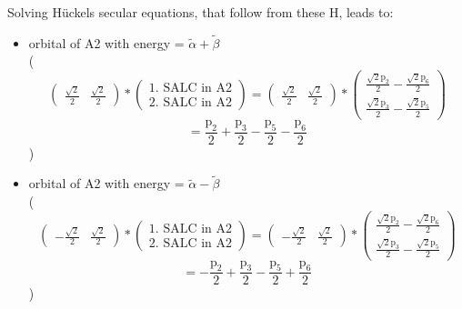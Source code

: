 \documentclass[12pt,a4paper]{article}
\begin{document}
Solving Hückels secular equations, that follow from these H, leads to:
\begin{itemize}
\item orbital of A2 with energy = 
                                $\tilde{\alpha} + \tilde{\beta}$ \\
( 
$$
\begin{pmatrix}\frac{\sqrt{2}}{2} & \frac{\sqrt{2}}{2}\end{pmatrix} * \left(\begin{array}{c}\text{1. SALC in A2} \\ \text{2. SALC in A2}\end{array}\right) = \begin{pmatrix}\frac{\sqrt{2}}{2} & \frac{\sqrt{2}}{2}\end{pmatrix} * \begin{pmatrix}\frac{\sqrt{2} \text{p}_{2}}{2} - \frac{\sqrt{2} \text{p}_{6}}{2}\\\frac{\sqrt{2} \text{p}_{3}}{2} - \frac{\sqrt{2} \text{p}_{5}}{2}\end{pmatrix} 
 $$ $$ = \frac{\text{p}_{2}}{2} + \frac{\text{p}_{3}}{2} - \frac{\text{p}_{5}}{2} - \frac{\text{p}_{6}}{2} 
 $$ 
 )

\item orbital of A2 with energy = 
                                $\tilde{\alpha} - \tilde{\beta}$ \\
( 
$$
\begin{pmatrix}- \frac{\sqrt{2}}{2} & \frac{\sqrt{2}}{2}\end{pmatrix} * \left(\begin{array}{c}\text{1. SALC in A2} \\ \text{2. SALC in A2}\end{array}\right) = \begin{pmatrix}- \frac{\sqrt{2}}{2} & \frac{\sqrt{2}}{2}\end{pmatrix} * \begin{pmatrix}\frac{\sqrt{2} \text{p}_{2}}{2} - \frac{\sqrt{2} \text{p}_{6}}{2}\\\frac{\sqrt{2} \text{p}_{3}}{2} - \frac{\sqrt{2} \text{p}_{5}}{2}\end{pmatrix} 
 $$ $$ = - \frac{\text{p}_{2}}{2} + \frac{\text{p}_{3}}{2} - \frac{\text{p}_{5}}{2} + \frac{\text{p}_{6}}{2} 
 $$ 
 )


\end{itemize}
\end{document}
